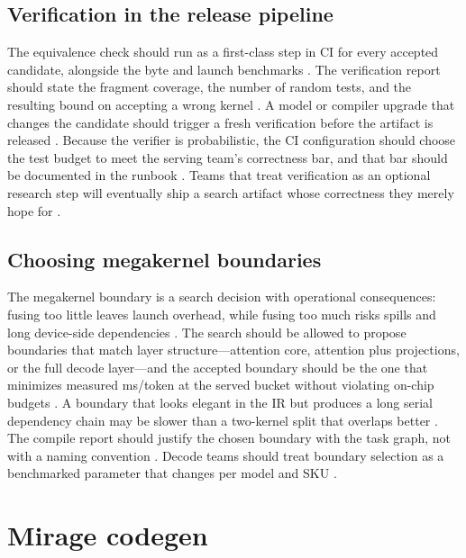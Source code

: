 \subsection{Verification in the release pipeline}

The equivalence check should run as a first-class step in CI for every accepted candidate, alongside the byte and launch benchmarks \citep{wu2024mirage,patel2025llminference}. The verification report should state the fragment coverage, the number of random tests, and the resulting bound on accepting a wrong kernel \citep{wu2024mirage,chen2020compilerbasedhardw}. A model or compiler upgrade that changes the candidate should trigger a fresh verification before the artifact is released \citep{memoryfloor2026,taxbreak2026}. Because the verifier is probabilistic, the CI configuration should choose the test budget to meet the serving team's correctness bar, and that bar should be documented in the runbook \citep{wu2024mirage,patel2025llminference}. Teams that treat verification as an optional research step will eventually ship a search artifact whose correctness they merely hope for \citep{memoryfloor2026,wu2024mirage}.

\subsection{Choosing megakernel boundaries}

The megakernel boundary is a search decision with operational consequences: fusing too little leaves launch overhead, while fusing too much risks spills and long device-side dependencies \citep{wu2024mirage,mpk2025,memoryfloor2026}. The search should be allowed to propose boundaries that match layer structure---attention core, attention plus projections, or the full decode layer---and the accepted boundary should be the one that minimizes measured ms/token at the served bucket without violating on-chip budgets \citep{dao2022flashattention,wu2024mirage}. A boundary that looks elegant in the IR but produces a long serial dependency chain may be slower than a two-kernel split that overlaps better \citep{mpk2025,patel2025llminference}. The compile report should justify the chosen boundary with the task graph, not with a naming convention \citep{wu2024mirage,memoryfloor2026}. Decode teams should treat boundary selection as a benchmarked parameter that changes per model and SKU \citep{taxbreak2026,nvidia2022hopper}.

\section{Mirage codegen}
\label{sec:ch20_mirage_codegen}

